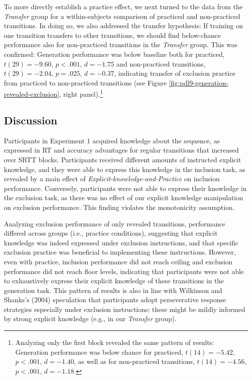 \documentclass[floatsintext,doc]{apa6}
\theoremstyle{definition}
\theoremstyle{definition}
\theoremstyle{definition}
\theoremstyle{remark}
\begin{document}
To more directly establish a practice effect, we next turned to the data
from the \emph{Transfer} group for a within-subjects comparison of
practiced and non-practiced transitions. In doing so, we also addressed
the transfer hypothesis: If training on one transition transfers to
other transitions, we should find below-chance performance also for
non-practiced transitions in the \emph{Transfer} group. This was
confirmed: Generation performance was below baseline both for practiced,
\(t(29) = -9.60\), \(p < .001\), \(d = -1.75\) and non-practiced
transitions, \(t(29) = -2.04\), \(p = .025\), \(d = -0.37\), indicating
transfer of exclusion practice from practiced to non-practiced
transitions (see Figure \ref{fig:pdl9-generation-revealed-exclusion},
right panel).\footnote{Analyzing only the first block revealed the same
  pattern of results: Generation performance was below chance for
  practiced, \(t(14) = -5.42\), \(p < .001\), \(d = -1.40\), as well as
  for non-practiced transitions, \(t(14) = -4.56\), \(p < .001\),
  \(d = -1.18\).}

\subsection{Discussion}\label{discussion}

Participants in Experiment 1 acquired knowledge about the sequence, as
expressed in RT and accuracy advantages for regular transitions that
increased over SRTT blocks. Participants received different amounts of
instructed explicit knowledge, and they were able to express this
knowledge in the inclusion task, as revealed by a main effect of
\emph{Explicit-knowledge-and-Practice} on inclusion performance.
Conversely, participants were not able to express their knowledge in the
exclusion task, as there was no effect of our explicit knowledge
manipulation on exclusion performance. This finding violates the
monotonicity assumption.

Analyzing exclusion performance of only revealed transitions,
performance differed across groups (i.e., practice conditions),
suggesting that explicit knowledge was indeed expressed under exclusion
instructions, and that specific exclusion practice was beneficial to
implementing these instructions. However, even with practice, inclusion
performance did not reach ceiling and exclusion performance did not
reach floor levels, indicating that participants were not able to
exhaustively express their explicit knowledge of these transitions in
the generation task. This pattern of results is also in line with
Wilkinson and Shanks's (2004) speculation that participants adopt
perseverative response strategies especially under exclusion
instructions; these might be mildly informed by strong explicit
knowledge (e.g., in our \emph{Transfer} group).
\end{document}
